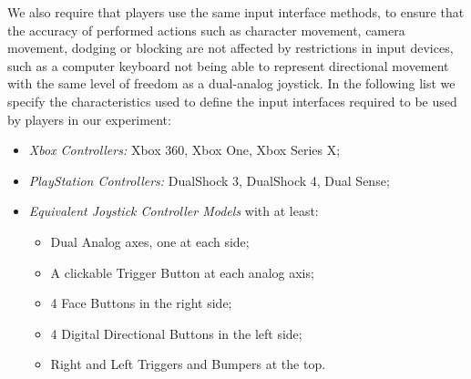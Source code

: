 We also require that players use the same input interface methods, to ensure that the accuracy of performed actions such as character movement, camera movement, dodging or blocking are not affected by restrictions in input devices, such as a computer keyboard not being able to represent directional movement with the same level of freedom as a dual-analog joystick. In the following list we specify the characteristics used to define the input interfaces required to be used by players in our experiment:  
\begin{itemize}
    \item{\emph{Xbox Controllers:} Xbox 360, Xbox One, Xbox Series X;}
    \item{\emph{PlayStation Controllers:} DualShock 3, DualShock 4, Dual Sense;}
    \item{\emph{Equivalent Joystick Controller Models} with at least:}
    \begin{itemize}
        \item{Dual Analog axes, one at each side;}
        \item{A clickable Trigger Button at each analog axis;}
        \item{4 Face Buttons in the right side;}
        \item{4 Digital Directional Buttons in the left side;}
        \item{Right and Left Triggers and Bumpers at the top.}
    \end{itemize}
\end{itemize}

